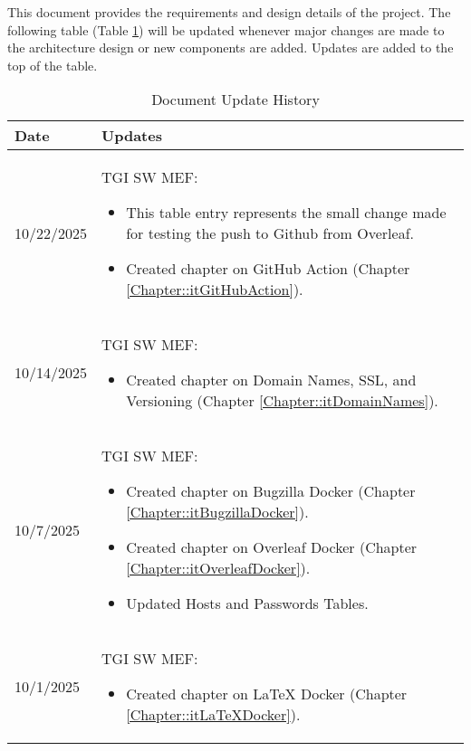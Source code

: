 This document provides the requirements and design details of the
project.  The following table (Table \ref{Table::UpdateHistory}) will be
updated whenever major changes are made to the architecture
design or new components are added. Updates are added to the top of the table.

\begin{longtable}{|l||p{13.5cm}|}
\caption{Document Update History \label{Table::UpdateHistory}}\\
\hline
\textbf{Date} & \textbf{Updates} \\
\hline 
\endhead

10/22/2025 & TGI SW MEF:
\begin{itemize}[topsep=0pt,itemsep=0pt,parsep=0pt,partopsep=0pt,leftmargin=12pt]
\item This table entry represents the small change made for testing the push to Github from Overleaf.
\item Created chapter on GitHub Action (Chapter \ref{Chapter::itGitHubAction}).
\end{itemize}
\\ \hline

10/14/2025 & TGI SW MEF:
\begin{itemize}[topsep=0pt,itemsep=0pt,parsep=0pt,partopsep=0pt,leftmargin=12pt]
\item Created chapter on Domain Names, SSL, and Versioning (Chapter \ref{Chapter::itDomainNames}).
\end{itemize}
\\ \hline

10/7/2025 & TGI SW MEF:
\begin{itemize}[topsep=0pt,itemsep=0pt,parsep=0pt,partopsep=0pt,leftmargin=12pt]
\item Created chapter on Bugzilla Docker (Chapter \ref{Chapter::itBugzillaDocker}).
\item Created chapter on Overleaf Docker (Chapter \ref{Chapter::itOverleafDocker}).
\item Updated Hosts and Passwords Tables.
\end{itemize}
\\ \hline

10/1/2025 & TGI SW MEF:
\begin{itemize}[topsep=0pt,itemsep=0pt,parsep=0pt,partopsep=0pt,leftmargin=12pt]
\item Created chapter on LaTeX Docker (Chapter \ref{Chapter::itLaTeXDocker}).
\end{itemize}
\\ \hline


\end{longtable}
